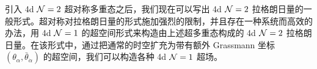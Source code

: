 引入 4d $\mathcal{N}=2$ 超对称多重态之后，我们现在可以写出 4d $\mathcal{N}=2$ 拉格朗日量的一般形式。超对称对拉格朗日量的形式施加强烈的限制，并且存在一种系统而高效的办法，用 4d $\mathcal{N}=1$ 的超空间形式来构造由上述超多重态构成的 4d $\mathcal{N}=2$ 拉格朗日量。在该形式中，通过把通常的时空扩充为带有额外 Grassmann 坐标 $(\theta_\alpha,\bar\theta_{\dot\alpha})$ 的超空间，我们可以构造各种 4d $\mathcal{N}=1$ 超场。
